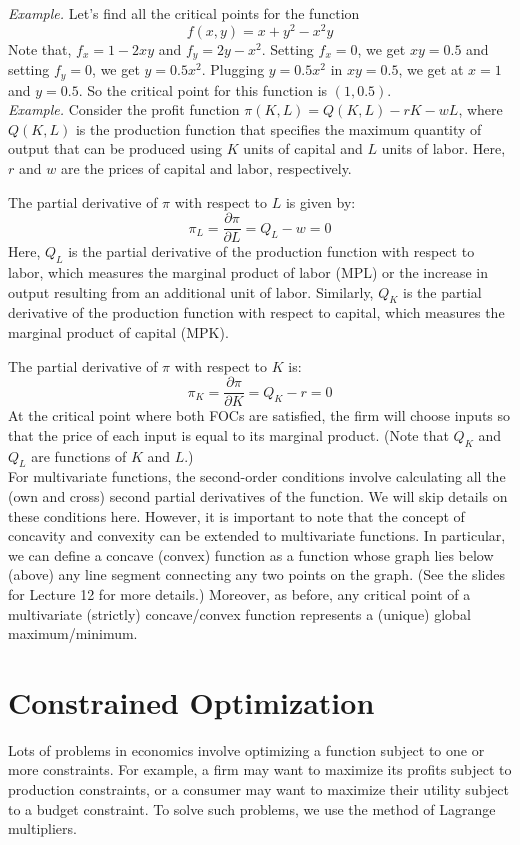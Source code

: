 \documentclass{./../../latex/handout}
\begin{document}
\textit{Example.} Let's find all the critical points for the function \[f(x,y) = x + y^2- x^2y\] 
Note that, $f_x=1-2xy$ and $f_y = 2y-x^2$. 
Setting $f_x=0$, we get $xy=0.5$ and setting $f_y=0$, we get $y=0.5x^2$. 
Plugging $y=0.5x^2$ in  $xy=0.5$, we get at $x=1$ and $y=0.5$. So the critical point for this function is $(1,0.5)$. \\

\textit{Example.}  Consider the profit function $\pi(K,L) = Q(K,L) - rK - wL$, where $Q(K,L)$ is the production function that specifies the maximum quantity of output that can be produced using $K$ units of capital and $L$ units of labor. Here, $r$ and $w$ are the prices of capital and labor, respectively. 

The partial derivative of $\pi$ with respect to $L$ is given by:
 \[ \pi_L = \frac{\partial \pi}{\partial L}  = Q_L-w = 0   \]
Here, $Q_L$ is the partial derivative of the production function with respect to labor, which measures the marginal product of labor (MPL) or the increase in output resulting from an additional unit of labor. Similarly, $Q_K$ is the partial derivative of the production function with respect to capital, which measures the marginal product of capital (MPK). 

The partial derivative of $\pi$ with respect to $K$ is:
\[ \pi_K = \frac{\partial \pi}{\partial K}  = Q_K-r = 0   \]
At the critical point where both FOCs are satisfied, the firm will choose inputs so that the price of each input is equal to its marginal product. (Note that $Q_K$ and $Q_L$ are functions of $K$ and $L$.) \\

For multivariate functions, the second-order conditions involve calculating all the (own and cross) second partial derivatives of the function. We will skip details on these conditions here. However, it is important to note that the concept of concavity and convexity can be extended to multivariate functions. In particular, we can define a concave (convex) function as a function whose graph lies below (above) any line segment connecting any two points on the graph. (See the slides for Lecture 12 for more details.) Moreover, as before, any critical point of a multivariate (strictly) concave/convex function represents a (unique) global maximum/minimum. 


\section{Constrained Optimization}
Lots of problems in economics involve optimizing a function subject to one or more constraints. For example, a firm may want to maximize its profits subject to production constraints, or a consumer may want to maximize their utility subject to a budget constraint. To solve such problems, we use the method of Lagrange multipliers. 
\end{document}

